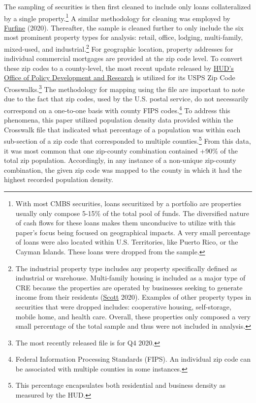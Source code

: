 \documentclass[11pt]{article} %
\begin{document}
The sampling of securities is then first cleaned to include only loans collateralized by a single property.\footnote{With most CMBS securities, loans securitized by a portfolio are properties usually only compose 5-15\% of the total pool of funds. The diversified nature of cash flows for these loans makes them unconducive to utilize with this paper's focus being focused on geographical impacts. A very small percentage of loans were also located within U.S. Territories, like Puerto Rico, or the Cayman Islands. These loans were dropped from the sample.} A similar methodology for cleaning was employed by \hyperlink{Furfine}{Furfine} (2020). Thereafter, the sample is cleaned further to only include the six most prominent property types for analysis: retail, office, lodging, multi-family, mixed-used, and industrial.\footnote{The industrial property type includes any property specifically defined as industrial or warehouse. Multi-family housing is included as a major type of CRE because the properties are operated by businesses seeking to generate income from their residents (\hyperlink{Scott}{Scott} 2020). Examples of other property types in securities that were dropped includes: cooperative housing, self-storage, mobile home, and health care. Overall, these properties only composed a very small percentage of the total sample and thus were not included in analysis.} For geographic location, property addresses for individual commercial mortgages are provided at the zip code level. To convert these zip codes to a county-level, the most recent update released by \href{https://www.huduser.gov/portal/home.html}{HUD’s Office of Policy Development and Research} is utilized for its USPS Zip Code Crosswalks.\footnote{The most recently released file is for Q4 2020.} The methodology for mapping using the file are important to note due to the fact that zip codes, used by the U.S. postal service, do not necessarily correspond on a one-to-one basis with county FIPS codes.\footnote{Federal Information Processing Standards (FIPS). An individual zip code can be associated with multiple counties in some instances.} To address this phenomena, this paper utilized population density data provided within the Crosswalk file that indicated what percentage of a population was within each sub-section of a zip code that corresponded to multiple counties.\footnote{This percentage encapsulates both residential and business density as measured by the HUD.} From this data, it was most common that one zip-county combination contained +90\% of the total zip population. Accordingly, in any instance of a non-unique zip-county combination, the given zip code was mapped to the county in which it had the highest recorded population density.
\end{document}
